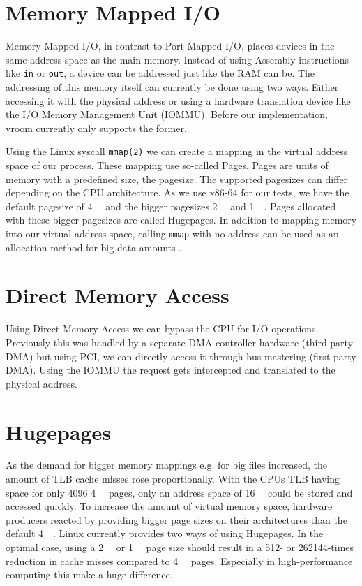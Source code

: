 \section{Memory Mapped I/O}
Memory Mapped I/O, in contrast to Port-Mapped I/O, places devices in the same address space as the main memory. Instead of using Assembly instructions like \texttt{in} or \texttt{out}, a device can be addressed just like the RAM can be. The addressing of this memory itself can currently be done using two ways. Either accessing it with the physical address or using a hardware translation device like the I/O Memory Management Unit (IOMMU). Before our implementation, vroom currently only supports the former. %

Using the Linux syscall \texttt{mmap(2)} we can create a mapping in the virtual address space of our process. These mapping use so-called Pages. Pages are units of memory with a predefined size, the pagesize. The supported pagesizes can differ depending on the CPU architecture. As we use x86-64 for our tests, we have the default pagesize of \qty{4}{\kibi\byte} and the bigger pagesizes \qty{2}{\mebi\byte} and \qty{1}{\gibi\byte}. Pages allocated with these bigger pagesizes are called Hugepages. In addition to mapping memory into our virtual address space, calling \texttt{mmap} with no address can be used as an allocation method for big data amounts \cite{mmapmanpage}.

\section{Direct Memory Access}
Using Direct Memory Access we can bypass the CPU for I/O operations. Previously this was handled by a separate DMA-controller hardware (third-party DMA) but using PCI, we can directly access it through bus mastering (first-party DMA). Using the IOMMU the request gets intercepted and translated to the physical address.

\section{Hugepages}
As the demand for bigger memory mappings e.g. for big files increased, the amount of TLB cache misses rose proportionally. With the CPUs TLB having space for only 4096 \qty{4}{\kibi\byte} pages, only an address space of \qty{16}{\mebi\byte} could be stored and accessed quickly. To increase the amount of virtual memory space, hardware producers reacted by providing bigger page sizes on their architectures than the default \qty{4}{\kibi\byte}.
Linux currently provides two ways of using Hugepages.
In the optimal case, using a \qty{2}{\mebi\byte} or \qty{1}{\gibi\byte} page size should result in a 512- or 262144-times reduction in cache misses compared to \qty{4}{\kibi\byte} pages. Especially in high-performance computing this make a huge difference.


